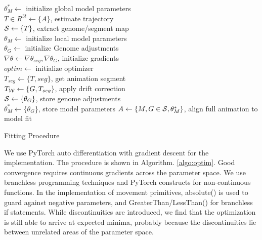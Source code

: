 \begin{algorithm}
    \SetAlgoLined
    $\theta^{*}_{M} \leftarrow$ initialize global model parameters\\
    $T\in R^{3t} \leftarrow \{A\}$, estimate trajectory\\
    $\mathcal{S} \leftarrow \{T\}$, extract genome/segment map\\
     {
        $\theta_{M} \leftarrow$ initialize local model parameters\\
        $\theta_{G} \leftarrow$ initialize Genome adjustments\\
        $\nabla{\theta} \leftarrow \nabla{\theta_{seg}},\nabla{\theta_{G}}$, initialize gradients\\
        $optim \leftarrow$ initialize optimizer\\
        $T_{seg} \leftarrow \{T,seg\}$, get animation segment\\
        $T_{\mathcal{W}} \leftarrow \{G,T_{seg}\}$, apply drift correction\\
        $\mathcal{S} \leftarrow \{\theta_G\}$, store genome adjustments\\
        $\theta^{*}_{M} \leftarrow \{\theta_G$\}, store model parameters
    }
    $A \leftarrow \{M,G \in \mathcal{S},\theta^{*}_{M}\}$, align full animation to model fit 
    \caption{Fitting Procedure}\label{algo:optim}
    \end{algorithm}
 We use PyTorch auto differentiation with gradient descent for the implementation. The procedure is shown in Algorithm. \ref{algo:optim}. Good convergence requires continuous gradients across the parameter space. We use branchless programming techniques and PyTorch constructs for non-continuous functions. In the implementation of movement primitives, absolute() is used to guard against negative parameters, and GreaterThan/LessThan() for branchless if statements. While discontinuities are introduced, we find that the optimization is still able to arrive at expected minima, probably because the discontinuities lie between unrelated areas of the parameter space.


